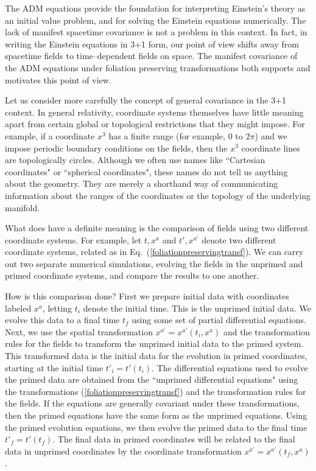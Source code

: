 \documentclass[letterpaper,nofootinbib,prd,amsmath,onecolumn]{revtex4-1}
\begin{document}
The ADM equations provide the foundation for interpreting Einstein's theory as an initial value problem, 
and for solving the Einstein equations numerically. 
The lack of manifest spacetime covariance is not a problem in this context. In fact, in writing the Einstein equations in 3+1 
form, our point of view shifts away from 
spacetime fields to time--dependent fields on space. The manifest covariance of the ADM equations under foliation preserving 
transformations both supports and motivates this point of view. 

Let us consider more carefully the concept of general covariance in the 3+1 context. 
In general relativity, coordinate systems themselves have little meaning apart from certain 
global or topological restrictions that they might impose. For example, if a coordinate $x^3$ has a finite range (for example, $0$ to $2\pi$) 
and we impose periodic boundary conditions on the fields, then the $x^3$ coordinate lines are topologically circles. 
Although we often use names like ``Cartesian coordinates" or ``spherical coordinates", these names do not tell us anything 
about the geometry. They 
are merely a shorthand way of communicating information about the ranges of the coordinates or the topology of the underlying manifold. 

What does have a definite meaning is the comparison of fields using two different coordinate systems. For example, let 
$t,x^{a}$ and $t',x^{a'}$ denote  
two different coordinate systems, related as in Eq.~(\ref{foliationpreservingtransf}). We can carry out two separate numerical simulations, 
evolving the fields in the unprimed and primed coordinate systems, and compare the results to one another.  

How is this comparison done? 
First we prepare initial data with coordinates labeled $x^a$, letting $t_i$ denote the initial time. This is the unprimed initial data. We evolve this data to a final 
time $t_f$ using some set of partial differential equations. Next, we use 
the spatial transformation $x^{a'} = x^{a'}(t_i,x^a)$ and the transformation rules for the fields to transform the unprimed initial data to the primed 
system. This transformed data is the initial data for the evolution in primed coordinates, starting at the initial time $t'_i = t'(t_i)$. 
The differential equations used to evolve the primed data are obtained from the ``unprimed differential equations" using the transformations (\ref{foliationpreservingtransf}) and 
the transformation rules for the fields. If the equations are generally covariant under these transformations, then the primed equations have the same form 
as the unprimed equations. Using the primed evolution equations, we then evolve the primed data to the final 
time $t'_f = t'(t_f)$. The final data in primed coordinates will be related to the final data in unprimed coordinates by the coordinate transformation 
$x^{a'} = x^{a'}(t_f,x^a)$. 
\end{document}

